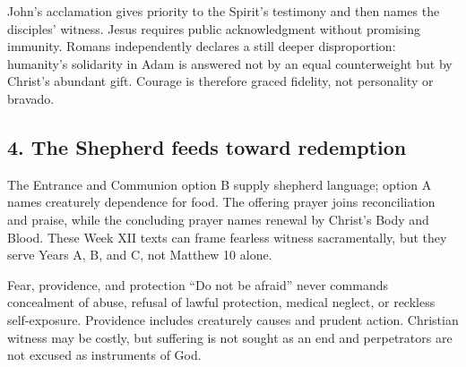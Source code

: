 John's acclamation gives priority to the Spirit's testimony and then names the disciples' witness. Jesus requires public acknowledgment without promising immunity. Romans independently declares a still deeper disproportion: humanity's solidarity in Adam is answered not by an equal counterweight but by Christ's abundant gift. Courage is therefore graced fidelity, not personality or bravado.

\subsection*{4. The Shepherd feeds toward redemption\enspace{}}

The Entrance and Communion option B supply shepherd language; option A names creaturely dependence for food. The offering prayer joins reconciliation and praise, while the concluding prayer names renewal by Christ's Body and Blood. These Week XII texts can frame fearless witness sacramentally, but they serve Years A, B, and C, not Matthew 10 alone.

\begin{studybox}{Fear, providence, and protection}
“Do not be afraid” never commands concealment of abuse, refusal of lawful protection, medical neglect, or reckless self-exposure. Providence includes creaturely causes and prudent action. Christian witness may be costly, but suffering is not sought as an end and perpetrators are not excused as instruments of God.
\end{studybox}
